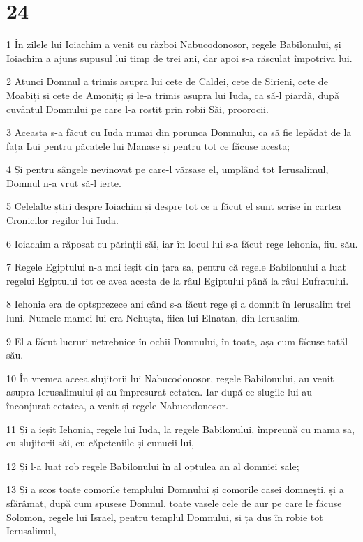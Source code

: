 \chapter{24}

\par 1 În zilele lui Ioiachim a venit cu război Nabucodonosor, regele Babilonului, și Ioiachim a ajuns supusul lui timp de trei ani, dar apoi s-a răsculat împotriva lui.
\par 2 Atunci Domnul a trimis asupra lui cete de Caldei, cete de Sirieni, cete de Moabiți și cete de Amoniți; și le-a trimis asupra lui Iuda, ca să-l piardă, după cuvântul Domnului pe care l-a rostit prin robii Săi, proorocii.
\par 3 Aceasta s-a făcut cu Iuda numai din porunca Domnului, ca să fie lepădat de la fața Lui pentru păcatele lui Manase și pentru tot ce făcuse acesta;
\par 4 Și pentru sângele nevinovat pe care-l vărsase el, umplând tot Ierusalimul, Domnul n-a vrut să-l ierte.
\par 5 Celelalte știri despre Ioiachim și despre tot ce a făcut el sunt scrise în cartea Cronicilor regilor lui Iuda.
\par 6 Ioiachim a răposat cu părinții săi, iar în locul lui s-a făcut rege Iehonia, fiul său.
\par 7 Regele Egiptului n-a mai ieșit din țara sa, pentru că regele Babilonului a luat regelui Egiptului tot ce avea acesta de la râul Egiptului până la râul Eufratului.
\par 8 Iehonia era de optsprezece ani când s-a făcut rege și a domnit în Ierusalim trei luni. Numele mamei lui era Nehușta, fiica lui Elnatan, din Ierusalim.
\par 9 El a făcut lucruri netrebnice în ochii Domnului, în toate, așa cum făcuse tatăl său.
\par 10 În vremea aceea slujitorii lui Nabucodonosor, regele Babilonului, au venit asupra Ierusalimului și au împresurat cetatea. Iar după ce slugile lui au înconjurat cetatea, a venit și regele Nabucodonosor.
\par 11 Și a ieșit Iehonia, regele lui Iuda, la regele Babilonului, împreună cu mama sa, cu slujitorii săi, cu căpeteniile și eunucii lui,
\par 12 Și l-a luat rob regele Babilonului în al optulea an al domniei sale;
\par 13 Și a scos toate comorile templului Domnului și comorile casei domnești, și a sfărâmat, după cum spusese Domnul, toate vasele cele de aur pe care le făcuse Solomon, regele lui Israel, pentru templul Domnului, și ța dus în robie tot Ierusalimul,
